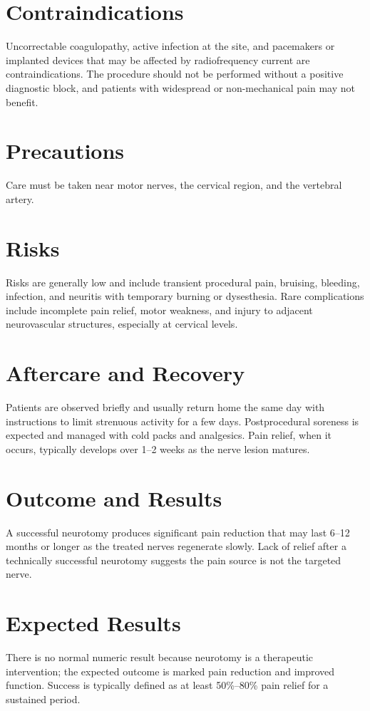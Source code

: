 \section*{Contraindications}
Uncorrectable coagulopathy, active infection at the site, and pacemakers or implanted devices that may be affected by radiofrequency current are contraindications. The procedure should not be performed without a positive diagnostic block, and patients with widespread or non-mechanical pain may not benefit.

\section*{Precautions}
Care must be taken near motor nerves, the cervical region, and the vertebral artery.

\section*{Risks}
Risks are generally low and include transient procedural pain, bruising, bleeding, infection, and neuritis with temporary burning or dysesthesia. Rare complications include incomplete pain relief, motor weakness, and injury to adjacent neurovascular structures, especially at cervical levels.

\section*{Aftercare and Recovery}
Patients are observed briefly and usually return home the same day with instructions to limit strenuous activity for a few days. Postprocedural soreness is expected and managed with cold packs and analgesics. Pain relief, when it occurs, typically develops over 1--2 weeks as the nerve lesion matures.

\section*{Outcome and Results}
A successful neurotomy produces significant pain reduction that may last 6--12 months or longer as the treated nerves regenerate slowly. Lack of relief after a technically successful neurotomy suggests the pain source is not the targeted nerve.

\section*{Expected Results}
There is no normal numeric result because neurotomy is a therapeutic intervention; the expected outcome is marked pain reduction and improved function. Success is typically defined as at least 50\%--80\% pain relief for a sustained period.

